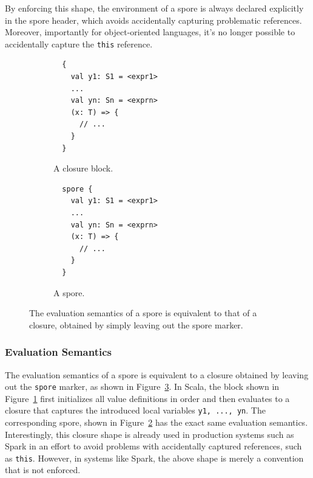 \documentclass[runningheads]{llncs}
\begin{document}
\begin{sloppypar}
By enforcing this shape, the environment of a spore is always declared
explicitly in the spore header, which avoids accidentally capturing
problematic references. Moreover, importantly for object-oriented languages, it's no
longer possible to accidentally capture the \verb|this| reference.

\begin{figure}%
\begin{subfigure}{.5\textwidth}
  \centering
  \begin{lstlisting}
  {
    val y1: S1 = <expr1>
    ...
    val yn: Sn = <exprn>
    (x: T) => {
      // ...
    }
  }
  \end{lstlisting}
  \caption{A closure block.}
  \label{fig:normal-block}
\end{subfigure}%
\begin{subfigure}{.5\textwidth}
  \centering
  \begin{lstlisting}
  spore {
    val y1: S1 = <expr1>
    ...
    val yn: Sn = <exprn>
    (x: T) => {
      // ...
    }
  }
  \end{lstlisting}
  \caption{A spore.}
  \label{fig:normal-spore-shape}
\end{subfigure}%
\caption{The evaluation semantics of a spore is equivalent to that of a closure, obtained by simply leaving out the spore marker.}
\label{fig:evaluation-semantics}
\vspace{-5mm}
\end{figure}


\subsubsection{Evaluation Semantics}

The evaluation semantics of a spore is equivalent to a closure
obtained by leaving out the \verb|spore| marker, as shown in
Figure~\ref{fig:evaluation-semantics}. In Scala, the block shown in
Figure~\ref{fig:normal-block} first initializes
all value definitions in order and then evaluates to a closure that captures
the introduced local variables \verb|y1, ..., yn|. The corresponding spore,
shown in Figure~\ref{fig:normal-spore-shape} has the exact same evaluation
semantics. Interestingly, this closure shape is already used in production
systems such as Spark in an effort to avoid problems with accidentally
captured references, such as \verb|this|. However, in systems like Spark, the
above shape is merely a convention that is not enforced.


\end{sloppypar}
\end{document}
